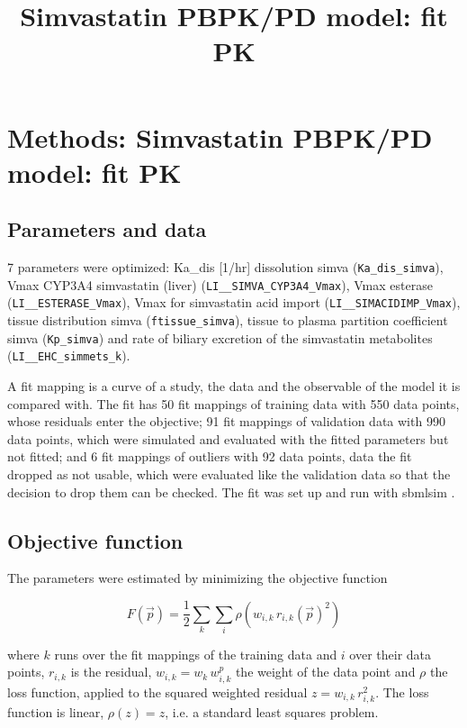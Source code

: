 \documentclass{article}
\title{Simvastatin PBPK/PD model: fit PK}
\date{}
\begin{document}
\maketitle

\section{Methods: Simvastatin PBPK/PD model: fit PK}

\subsection{Parameters and data}

7 parameters were optimized: Ka\_dis [1/hr] dissolution simva (\texttt{Ka\_dis\_simva}), Vmax CYP3A4 simvastatin (liver) (\texttt{LI\_\_SIMVA\_CYP3A4\_Vmax}), Vmax esterase (\texttt{LI\_\_ESTERASE\_Vmax}), Vmax for simvastatin acid import (\texttt{LI\_\_SIMACIDIMP\_Vmax}), tissue distribution simva (\texttt{ftissue\_simva}), tissue to plasma partition coefficient simva (\texttt{Kp\_simva}) and rate of biliary excretion of the simvastatin metabolites (\texttt{LI\_\_EHC\_simmets\_k}).

A fit mapping is a curve of a study, the data and the observable of the model it is compared with. The fit has 50 fit mappings of training data with 550 data points, whose residuals enter the objective; 91 fit mappings of validation data with 990 data points, which were simulated and evaluated with the fitted parameters but not fitted; and 6 fit mappings of outliers with 92 data points, data the fit dropped as not usable, which were evaluated like the validation data so that the decision to drop them can be checked. The fit was set up and run with sbmlsim \cite{Koenig2026_sbmlsim}.

\subsection{Objective function}

The parameters were estimated by minimizing the objective function

\begin{equation}
F(\vec{p}) = \frac{1}{2} \sum_{k} \sum_{i} \rho\left(w_{i,k}\, r_{i,k}(\vec{p})^2\right)
\end{equation}

where $k$ runs over the fit mappings of the training data and $i$ over their data points, $r_{i,k}$ is the residual, $w_{i,k} = w_k\, w^{p}_{i,k}$ the weight of the data point and $\rho$ the loss function, applied to the squared weighted residual $z = w_{i,k}\, r_{i,k}^2$. The loss function is linear, $\rho(z) = z$, i.e. a standard least squares problem.
\end{document}
